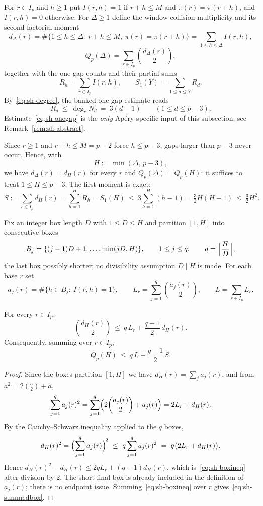 For $r\in I_p$ and $h\ge1$ put $I(r,h)=1$ if $r+h\le M$ and
$\pi(r)=\pi(r+h)$, and $I(r,h)=0$ otherwise.  For $\Delta\ge1$ define the
window collision multiplicity and its second factorial moment
\[
 d_\Delta(r)=\#\{1\le h\le\Delta:\ r+h\le M,\ \pi(r)=\pi(r+h)\}
            =\sum_{1\le h\le\Delta}I(r,h),
\]
\[
 Q_p(\Delta)=\sum_{r\in I_p}\binom{d_\Delta(r)}{2},
\]
together with the one-gap counts and their partial sums
\[
 R_h=\sum_{r\in I_p}I(r,h),
 \qquad
 S_1(Y)=\sum_{1\le d\le Y}R_d .
\]
By~\eqref{eq:sh-degree}, the banked one-gap estimate reads
\begin{equation}\label{eq:sh-onegap}
 R_d\ \le\ \deg_rN_d\ =\ 3(d-1)\qquad(1\le d\le p-3).
\end{equation}
Estimate~\eqref{eq:sh-onegap} is the \emph{only} Ap\'ery-specific input of
this subsection; see Remark~\ref{rem:sh-abstract}.

Since $r\ge1$ and $r+h\le M=p-2$ force $h\le p-3$, gaps larger than $p-3$
never occur.  Hence, with
\[
 H:=\min(\Delta,\,p-3),
\]
we have $d_\Delta(r)=d_H(r)$ for every $r$ and $Q_p(\Delta)=Q_p(H)$; it
suffices to treat $1\le H\le p-3$.  The first moment is exact:
\begin{equation}\label{eq:sh-firstmoment}
 S:=\sum_{r\in I_p}d_H(r)=\sum_{h=1}^{H}R_h=S_1(H)
 \ \le\ 3\sum_{h=1}^{H}(h-1)=\tfrac32H(H-1)\ \le\ \tfrac32H^2 .
\end{equation}

Fix an integer box length $D$ with $1\le D\le H$ and partition $[1,H]$
into consecutive boxes
\[
 B_j=\{(j-1)D+1,\ldots,\min(jD,H)\},\qquad 1\le j\le q,\qquad
 q=\Bigl\lceil\frac HD\Bigr\rceil,
\]
the last box possibly shorter; no divisibility assumption $D\mid H$ is
made.  For each base $r$ set
\[
 a_j(r)=\#\{h\in B_j:\ I(r,h)=1\},
 \qquad
 L_r=\sum_{j=1}^{q}\binom{a_j(r)}{2},
 \qquad
 L=\sum_{r\in I_p}L_r .
\]

\begin{lemma}\label{lem:sh-box}
For every $r\in I_p$,
\begin{equation}\label{eq:sh-boxineq}
 \binom{d_H(r)}{2}\ \le\ q\,L_r+\frac{q-1}{2}\,d_H(r).
\end{equation}
Consequently, summing over $r\in I_p$,
\begin{equation}\label{eq:sh-summedbox}
 Q_p(H)\ \le\ q\,L+\frac{q-1}{2}\,S .
\end{equation}
\end{lemma}

\begin{proof}
Since the boxes partition $[1,H]$ we have $d_H(r)=\sum_ja_j(r)$, and from
$a^2=2\binom a2+a$,
\[
 \sum_{j=1}^{q}a_j(r)^2
 =\sum_{j=1}^{q}\Bigl(2\binom{a_j(r)}{2}+a_j(r)\Bigr)
 =2L_r+d_H(r).
\]
By the Cauchy--Schwarz inequality applied to the $q$ boxes,
\[
 d_H(r)^2=\Bigl(\sum_{j=1}^{q}a_j(r)\Bigr)^{\!2}
 \ \le\ q\sum_{j=1}^{q}a_j(r)^2
 \ =\ q\bigl(2L_r+d_H(r)\bigr).
\]
Hence $d_H(r)^2-d_H(r)\le 2qL_r+(q-1)d_H(r)$, which
is~\eqref{eq:sh-boxineq} after division by $2$.  The short final box is
already included in the definition of $a_j(r)$; there is no endpoint
issue.  Summing~\eqref{eq:sh-boxineq} over $r$
gives~\eqref{eq:sh-summedbox}.
\end{proof}

